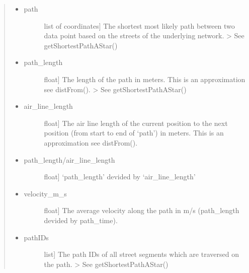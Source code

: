 \documentclass[letterpaper,10pt,english]{sphinxmanual}
\begin{document}
\begin{fulllineitems}
\begin{quote}
\begin{description}
\begin{description}
\begin{itemize}
\item {} \begin{description}
\item[{path}] \leavevmode{[}list of coordinates{]}
The shortest \textendash{} most likely \textendash{} path between two data point based on the streets of the underlying network. \textendash{}\textgreater{} See getShortestPathAStar()

\end{description}

\item {} \begin{description}
\item[{path\_length}] \leavevmode{[}float{]}
The length of the path in meters. This is an approximation \textendash{} see distFrom(). \textendash{}\textgreater{} See getShortestPathAStar()

\end{description}

\item {} \begin{description}
\item[{air\_line\_length}] \leavevmode{[}float{]}
The air line length of the current position to the next position (from start to end of ‘path’) in meters. This is an approximation \textendash{} see distFrom().

\end{description}

\item {} \begin{description}
\item[{path\_length/air\_line\_length}] \leavevmode{[}float{]}
‘path\_length’ devided by ‘air\_line\_length’

\end{description}

\item {} \begin{description}
\item[{velocity\_m\_s}] \leavevmode{[}float{]}
The average velocity along the path in m/s (path\_length devided by path\_time).

\end{description}

\item {} \begin{description}
\item[{pathIDs}] \leavevmode{[}list{]}
The path IDs of all street segments which are traversed on the path. \textendash{}\textgreater{} See getShortestPathAStar()


\end{description}
\end{itemize}
\end{description}
\end{description}
\end{quote}
\end{fulllineitems}
\end{document}
